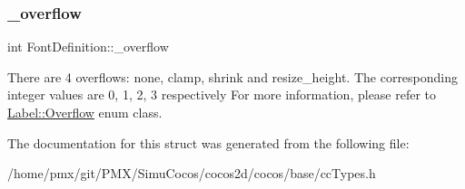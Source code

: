 \subsubsection{\texorpdfstring{\+\_\+overflow}{\_overflow}}
{\footnotesize\ttfamily int Font\+Definition\+::\+\_\+overflow}

There are 4 overflows\+: none, clamp, shrink and resize\+\_\+height. The corresponding integer values are 0, 1, 2, 3 respectively For more information, please refer to \hyperlink{classLabel_af7d31998ea743e8ca64eb1a983fa6a4c}{Label\+::\+Overflow} enum class. 

The documentation for this struct was generated from the following file\+:\begin{DoxyCompactItemize}
\item 
/home/pmx/git/\+P\+M\+X/\+Simu\+Cocos/cocos2d/cocos/base/cc\+Types.\+h\end{DoxyCompactItemize}
